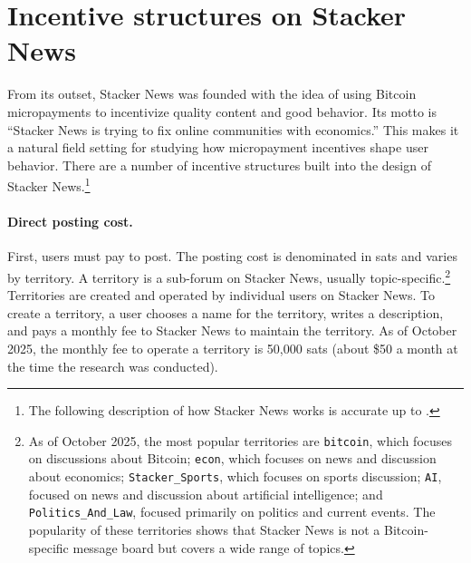 \section{Incentive structures on Stacker News} \label{sec_incentives}

From its outset, Stacker News was founded with the idea of using Bitcoin micropayments to incentivize quality content and good behavior. Its motto is ``Stacker News is trying to fix online communities with economics.'' This makes it a natural field setting for studying how micropayment incentives shape user behavior. There are a number of incentive structures built into the design of Stacker News.\footnote{The following description of how Stacker News works is accurate up to .} 

\paragraph{Direct posting cost.} First, users must pay to post. The posting cost is denominated in sats and varies by territory. A territory is a sub-forum on Stacker News, usually topic-specific.\footnote{As of October 2025, the most popular territories are \texttt{bitcoin}, which focuses on discussions about Bitcoin; \texttt{econ}, which focuses on news and discussion about economics; \texttt{Stacker\_Sports}, which focuses on sports discussion; \texttt{AI}, focused on news and discussion about artificial intelligence; and \texttt{Politics\_And\_Law}, focused primarily on politics and current events. The popularity of these territories shows that Stacker News is not a Bitcoin-specific message board but covers a wide range of topics.} Territories are created and operated by individual users on Stacker News. To create a territory, a user chooses a name for the territory, writes a description, and pays a monthly fee to Stacker News to maintain the territory. As of October 2025, the monthly fee to operate a territory is 50,000 sats (about \$50 a month at the time the research was conducted).

